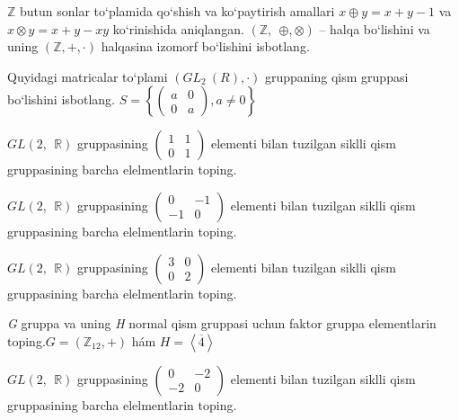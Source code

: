 \(\mathbb{Z}\) butun sonlar to`plamida qo`shish va ko`paytirish amallari \(x \oplus y = x + y - 1\) va \(x \otimes y = x + y - xy\) ko`rinishida aniqlangan. \((\mathbb{Z},\ \  \oplus , \otimes )\) -- halqa bo`lishini va uning \((\mathbb{Z}, + , \cdot )\) halqasina izomorf bo`lishini isbotlang.

Quyidagi matricalar to`plami \((GL_{2}^{\ }\ (R), \cdot )\) gruppaning qism gruppasi bo`lishini isbotlang. \(S = \left\{ \begin{pmatrix}
a & 0 \\
0 & a
\end{pmatrix},a \neq 0 \right\}\)

\(GL(2,\mathbb{\ \ R})\) gruppasining \(\begin{pmatrix}
1 & 1 \\
0 & 1
\end{pmatrix}\) elementi bilan tuzilgan siklli qism gruppasining barcha elelmentlarin toping.

\(GL(2,\mathbb{\ \ R})\) gruppasining \(\begin{pmatrix}
0 & - 1 \\
 - 1 & 0
\end{pmatrix}\) elementi bilan tuzilgan siklli qism gruppasining barcha elelmentlarin toping.

\(GL(2,\mathbb{\ \ R})\) gruppasining \(\begin{pmatrix}
3 & 0 \\
0 & 2
\end{pmatrix}\) elementi bilan tuzilgan siklli qism gruppasining barcha elelmentlarin toping.

\emph{G} gruppa va uning \emph{H} normal qism gruppasi uchun faktor gruppa elementlarin toping.\(G = (\mathbb{Z}_{12}, + )\) hám \(H = \left\langle \overline{4} \right\rangle\)

\(GL(2,\mathbb{\ \ R})\) gruppasining \(\begin{pmatrix}
0 & - 2 \\
 - 2 & 0
\end{pmatrix}\) elementi bilan tuzilgan siklli qism gruppasining barcha elelmentlarin toping.